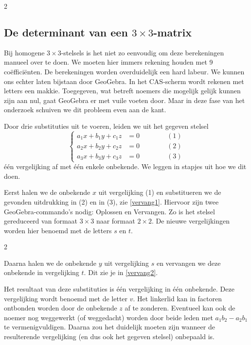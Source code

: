 \begin{multicols}{2}

\subsection{De determinant van een $3 \times 3$-matrix}

Bij homogene $3 \times 3$-stelsels is het niet zo eenvoudig om deze berekeningen manueel over te doen. We moeten hier immers rekening houden met 9 coëfficiënten. De berekeningen worden overduidelijk een hard labeur. We kunnen ons echter laten bijstaan door GeoGebra. In het CAS-scherm wordt rekenen met letters een makkie. Toegegeven, wat betreft noemers die mogelijk gelijk kunnen zijn aan nul, gaat GeoGebra er met vuile voeten door. Maar in deze fase van het onderzoek schuiven we dit probleem even aan de kant.  

Door drie substituties uit te voeren, leiden we uit het gegeven stelsel 
\[ \left\{ \begin{aligned} 
        a_1 x+b_1 y+c_1 z & = 0 \qquad \qquad (1)\\
        a_2 x+b_2 y+c_2 z & = 0 \qquad \qquad (2)\\
        a_3 x+b_3 y+c_3 z & = 0 \qquad \qquad (3)
\end{aligned} \right. \]
één vergelijking af met één enkele onbekende. We leggen in stapjes uit hoe we dit doen.

Eerst halen we de onbekende $x$ uit vergelijking (1) en substitueren we de gevonden uitdrukking in (2) en in (3), zie \autoref{vervang1}. Hiervoor zijn twee GeoGebra-commando's nodig: Oplossen en Vervangen. Zo is het stelsel gereduceerd van formaat $3 \times 3$ naar formaat $2 \times 2$. De nieuwe vergelijkingen worden hier benoemd met de letters $s$ en $t$.

\end{multicols}


\begin{multicols}{2}

Daarna halen we de onbekende $y$ uit vergelijking $s$ en vervangen we deze onbekende in vergelijking $t$. Dit zie je in \autoref{vervang2}.

Het resultaat van deze substituties is één vergelijking in één onbekende. Deze vergelijking wordt benoemd met de letter $v$. Het linkerlid kan in factoren ontbonden worden door de onbekende $z$ af te zonderen. Eventueel kan ook de noemer nog weggewerkt (of weggedacht) worden door beide leden met $a_1 b_2-a_2 b_1$ te vermenigvuldigen. Daarna zou het duidelijk moeten zijn wanneer de resulterende  vergelijking (en dus ook het gegeven stelsel) onbepaald is.

\end{multicols}

